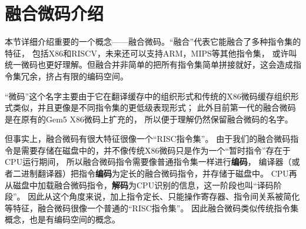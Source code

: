 \section{融合微码介绍}
本节详细介绍重要的一个概念——融合微码。“融合”代表它能融合了多种指令集的特征，
包括X86和RISCV，未来还可以支持ARM，MIPS等其他指令集，
或许叫统一微码也更好理解。但融合并非简单的把所有指令集简单拼接就好，这会造成指令集冗余，挤占有限的编码空间。

“微码”这个名字主要由于它在翻译缓存中的组织形式和传统的X86微码缓存组织形式类似，并且更像是不同指令集的更低级表现形式；
此外目前第一代的融合微码是在原有的Gem5 X86微码上扩充的，
所以便于理解仍然保留融合微码的名字。

但事实上，融合微码有很大特征很像一个“RISC指令集”。
由于我们的融合微码指令是需要存储在磁盘中的，并不像传统X86微码只是作为一个“暂时指令”存在于CPU运行期间，
所以融合微码指令需要像普通指令集一样进行\textbf{编码}，
编译器（或者二进制翻译器）把指令\textbf{编码}为定长的融合微码指令，并存储于磁盘中。
CPU再从磁盘中加载融合微码指令，\textbf{解码}为CPU识别的信息，这一阶段也叫“译码阶段”。
因此从这个角度来说，加上指令定长、只能操作寄存器、指令间关系被简化等特征，融合微码很像一个普通的“RISC指令集”。
因此融合微码类似传统指令集概念，也是有编码空间的概念。